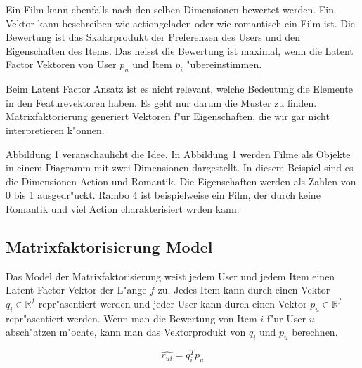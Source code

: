 \documentclass[a4paper, 12pt]{article}
\begin{document}
 Ein Film kann ebenfalls nach den selben Dimensionen bewertet werden. Ein Vektor kann beschreiben wie actiongeladen oder wie romantisch ein Film ist. Die Bewertung ist das Skalarprodukt der Preferenzen des Users und den Eigenschaften des Items. Das heisst die Bewertung ist maximal, wenn die Latent Factor Vektoren von User $p_u$ und Item $p_i$ "ubereinstimmen.

Beim Latent Factor Ansatz ist es nicht relevant, welche Bedeutung die Elemente in den Featurevektoren haben. Es geht nur darum die Muster zu finden. Matrixfaktorierung generiert Vektoren f"ur Eigenschaften, die wir gar nicht interpretieren k"onnen.

Abbildung \ref{fig:moviedimension} veranschaulicht die Idee. In Abbildung \ref{fig:moviedimension} werden Filme als Objekte in einem Diagramm mit zwei Dimensionen dargestellt. In diesem Beispiel sind es die Dimensionen Action und Romantik. Die Eigenschaften werden als Zahlen von 0 bis 1 ausgedr"uckt. Rambo 4 ist beispielweise ein Film, der durch keine Romantik und viel Action charakterisiert wrden kann.

\begin{figure}
\centering
{}
\label{fig:moviedimension}
\end{figure}


\subsection{Matrixfaktorisierung Model}
\label{sec:matrixfactorizationmodel}

Das Model der Matrixfaktorisierung weist jedem User und jedem Item einen Latent Factor Vektor der L"ange $f$ zu. Jedes Item kann durch einen Vektor $q_i \in \mathbb{R}^f$ repr"asentiert werden und jeder User kann durch einen Vektor $p_u \in \mathbb{R}^f$ repr"asentiert werden. Wenn man die Bewertung von Item $i$ f"ur User $u$ absch"atzen m"ochte, kann man das Vektorprodukt von $q_i$ und $p_u$ berechnen.

\begin{equation}
  \label{eq:rui}
  \hat{r_{ui}} = q_i^T p_u
\end{equation}
\end{document}
